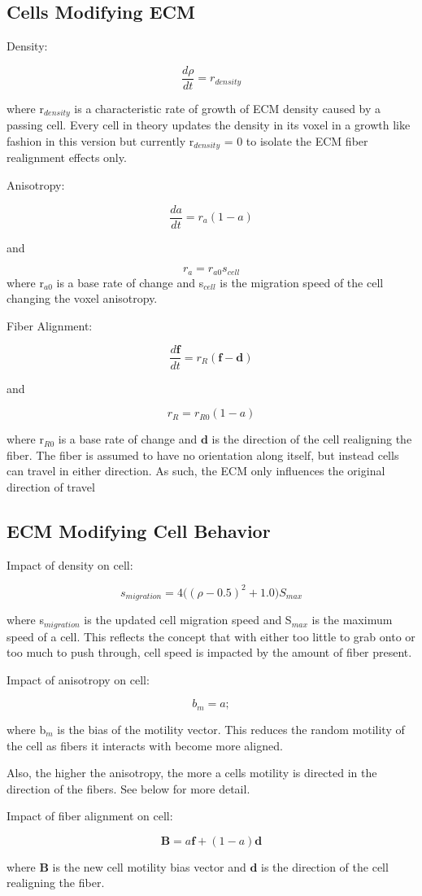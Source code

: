 \documentclass[11pt]{article}
\newcommand{\beq}{\begin{equation}}
\newcommand{\eeq}{\end{equation}}
\renewcommand{\vec}[1]{\mathbf{#1}}
\renewcommand{\vec}[1]{\mathbf{#1}}
\renewcommand{\vec}[1]{\mathbf{#1}}
\renewcommand{\vec}[1]{\mathbf{#1}}
\begin{document}
\subsection{Cells Modifying ECM}\label{sec:cells_to_ecm}

Density: 

\beq
\frac{d\rho}{dt} = r_{density}
\eeq

where r$_{density}$ is a characteristic rate of growth of ECM density caused by a passing cell. Every cell in theory updates the density in its voxel in a growth like fashion in this version but currently r$_{density}$ = 0 to isolate the ECM fiber realignment effects only.

Anisotropy:

\beq
\frac{da}{dt} = r_{a}(1-a)
\eeq

and

\beq
r_{a} = r_{a0} s_{cell}
\eeq
where r$_{a0}$ is a base rate of change and s$_{cell}$ is the migration speed of the cell changing the voxel anisotropy. 

Fiber Alignment:

\beq
\frac{d\vec f}{dt} = r_R (\vec f - \vec d)
\eeq

and 

\beq
r_R = r_{R0} (1-a)
\eeq

where r$_{R0}$ is a base rate of change and $\vec d$ is the direction of the cell realigning the fiber. The fiber is assumed to have no orientation along itself, but instead cells can travel in either direction. As such, the ECM only influences the original direction of travel

\subsection{ECM Modifying Cell Behavior}\label{sec:ecm_to_cells}

Impact of density on cell:

\beq
s_{migration} = 4 \big((\rho-0.5)^2 + 1.0 \big)S_{max}
\eeq

where s$_{migration}$ is the updated cell migration speed and S$_{max}$ is the maximum speed of a cell. This reflects the concept that with either too little to grab onto or too much to push through, cell speed is impacted by the amount of fiber present.


Impact of anisotropy on cell:

\beq
b_m = a;
\eeq

where b$_m$ is the bias of the motility vector. This reduces the random motility of the cell as fibers it interacts with become more aligned.

Also, the higher the anisotropy, the more a cells motility is directed in the direction of the fibers. See below for more detail.

Impact of fiber alignment on cell:


\beq
\vec  B = a \vec f + (1-a) \vec d
\eeq

where $\vec B$ is the new cell motility bias vector and $\vec d$ is the direction of the cell realigning the fiber.
\end{document}
